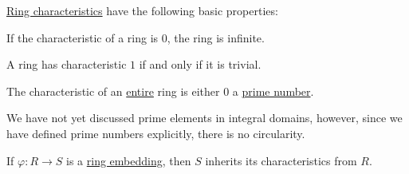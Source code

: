 \begin{proposition}\label{thm:def:ring_characteristic}
  \hyperref[def:ring_characteristic]{Ring characteristics} have the following basic properties:
  \begin{thmenum}
     If the characteristic of a ring is \( 0 \), the ring is infinite.

     A ring has characteristic \( 1 \) if and only if it is trivial.

     The characteristic of an \hyperref[def:entire_semiring]{entire} ring is either \( 0 \) a \hyperref[def:prime_number]{prime number}.

    We have not yet discussed prime elements in integral domains, however, since we have defined prime numbers explicitly, there is no circularity.

     If \( \varphi: R \to S \) is a \hyperref[def:ring/homomorphism]{ring embedding}, then \( S \) inherits its characteristics from \( R \).
  \end{thmenum}
\end{proposition}
